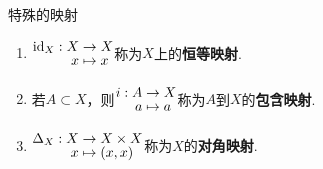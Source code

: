\begin{definition}{特殊的映射}
    \begin{enumerate}
        \item ${\setjot[-2]\begin{aligned}
            \mathrm{id}_X: X &\to X \\
            x &\mapsto x
        \end{aligned}}$称为$X$上的\textbf{恒等映射}.
        \item 若$A\subset X$，则${\setjot[-2]\begin{aligned}
            i:A &\to X \\
            a &\mapsto a
        \end{aligned}}$称为$A$到$X$的\textbf{包含映射}.
        \item $\setjot[-2]\begin{aligned}
            \Delta_X:X &\to X\times X \\
            x &\mapsto (x,x)
        \end{aligned}$称为$X$的\textbf{对角映射}.
    \end{enumerate}
\end{definition}


